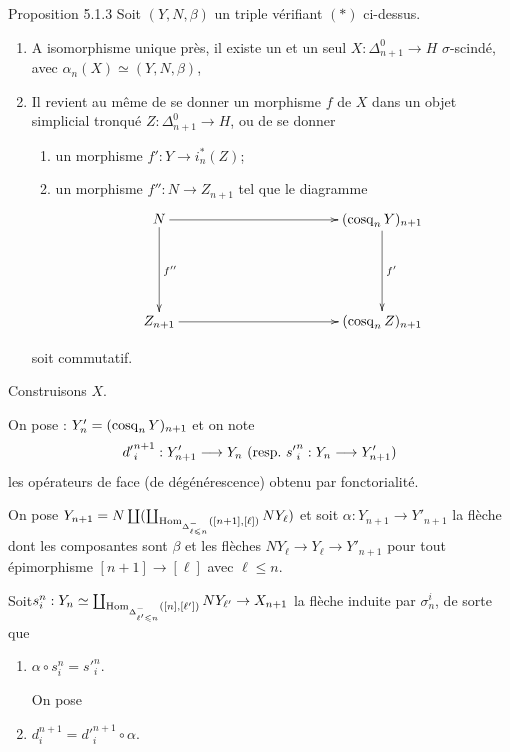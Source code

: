 \documentclass[10pt]{../fichiers-configuration-latex/smfart}
\begin{document}
\begin{enonce*}{Proposition 5.1.3}
Soit $(Y, N, \beta)$ un triple vérifiant $(\ast)$ ci-dessus.
\begin{enumerate}
\renewcommand{\theenumi}{\roman {enumi}}
\renewcommand{\labelenumi}{(\theenumi)}
\item A isomorphisme unique près, il existe un et un seul $X :
  \Delta^{0}_{n+1} \to H$ $\sigma$-scindé, avec $\alpha_n (X) \simeq
  (Y, N, \beta)$,

\item Il revient au même de se donner un morphisme $f$ de $X$ dans un
  objet simplicial tronqué $Z : \Delta^0_{n+1} \to H$, ou de se
  donner
\begin{enumerate}
\renewcommand{\labelenumii}{\theenumii)}
\item un morphisme $f': Y \to i^{\ast}_n (Z)$;

\item un morphisme $f'': N \to Z_{n+1}$ tel que le diagramme
\[
\xymatrix@C=4cm@R=2cm{
N  \ar[r] \ar[d]^{f''}& (\cosq_n Y)_{n+1} \ar[d]^{f'}\\
Z_{n+1} \ar[r]& (\cosq_n Z)_{n+1}
}
\]
\end{enumerate}
soit commutatif.
\end{enumerate}
\end{enonce*}

Construisons $X$.

On pose : $Y'_n = (\operatorname{cosq}_n Y)_{n+1}$ et on note $${d'}^{n+1}_i : %
Y'_{n+1} \to Y_n\ (\textup{resp.\ }{s'}^n_i : Y_n \to Y'_{n+1})$$ les
opérateurs de face (\resp de dégénérescence) obtenu par
fonctorialité.

\noindent \sisi{$+$}{} On pose $Y_{n+1} = N \coprod (
\coprod_{\operatorname{Hom}_{\Delta^{-}_{\ell \leqslant n}}([n+1],
  [\ell])} N Y_{\ell} )$ et soit $\alpha : Y_{n+1} \to
Y'_{n+1}$ la flèche dont les composantes sont $\beta$ et les flèches
$N Y_{\ell} \to Y_{\ell} \to Y'_{n+1}$ pour tout épimorphisme $[n+1]
\to [\ell]$ avec $\ell \leq n$.

\noindent \sisi{$+$}{} Soit\pageoriginale $s^n_i : Y_n \simeq
\coprod_{\Hom_{\Delta^{-}_{\ell' \leq n}}([n], [{\ell}'])} N Y_{{\ell}'} \to
X_{n+1}$ la flèche induite par $\sigma^i_n$, de sorte que
\begin{enumerate}
\renewcommand{\theenumi}{\Roman{enumi}}
\renewcommand{\labelenumi}{(\theenumi)}
\item $\alpha \circ s^n_i =  {{s}'}^n_i$.

On pose

\item $d^{n+1}_i = {d'}^{n+1}_i \circ \alpha$.
\end{enumerate}
\end{document}
